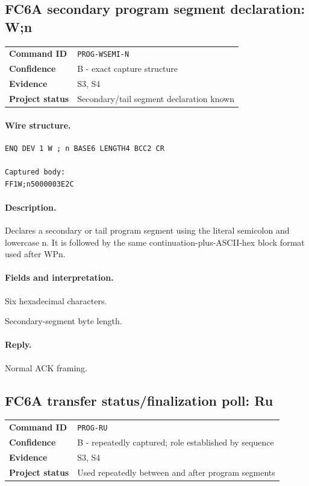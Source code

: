 \documentclass[10pt,letterpaper]{article}
\begin{document}
\subsection{FC6A secondary program segment declaration: W;n}
\begin{tabularx}{\textwidth}{@{}>{\bfseries}p{2.8cm}X@{}}
Command ID & \texttt{PROG-WSEMI-N} \\
Confidence & B - exact capture structure \\
Evidence & S3, S4 \\
Project status & Secondary/tail segment declaration known \\
\end{tabularx}
\vspace{0.35em}
\paragraph{Wire structure.}
\begin{Verbatim}[breaklines=true,breakanywhere=true,fontsize=\small]
ENQ DEV 1 W ; n BASE6 LENGTH4 BCC2 CR

Captured body:
FF1W;n5000003E2C
\end{Verbatim}
\paragraph{Description.} Declares a secondary or tail program segment using the literal semicolon and lowercase n. It is followed by the same continuation-plus-ASCII-hex block format used after WPn.
\paragraph{Fields and interpretation.}
\begin{description}[style=nextline,leftmargin=3.2cm,labelwidth=3.0cm,font=\normalfont\bfseries]
\item[BASE6] Six hexadecimal characters.
\item[LENGTH4] Secondary-segment byte length.
\end{description}
\paragraph{Reply.} Normal ACK framing.

\subsection{FC6A transfer status/finalization poll: Ru}
\begin{tabularx}{\textwidth}{@{}>{\bfseries}p{2.8cm}X@{}}
Command ID & \texttt{PROG-RU} \\
Confidence & B - repeatedly captured; role established by sequence \\
Evidence & S3, S4 \\
Project status & Used repeatedly between and after program segments \\
\end{tabularx}
\vspace{0.35em}
\end{document}
